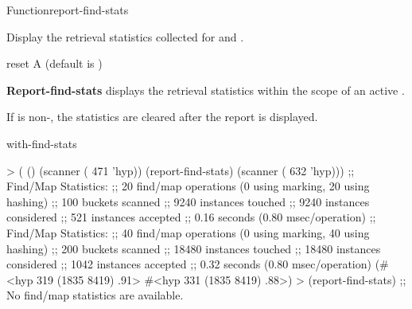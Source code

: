 \documentclass[10pt,twoside,english,pdftex]{article}
\begin{document}

\begin{functiondoc}{Function}{report-find-stats}{ }
%
%
%
  
\fnsyntax

\fnpurpose 
{}%
%
Display the retrieval statistics collected for
\textbf{} and
\textbf{}.

\fnpackage {}

\fnmodule {}

\fnargs
\begin{args}{reset}
\arg[reset] A  (default is \nil)
\end{args}

\fndescription 
{}%
\textbf{Report-find-stats} displays the retrieval statistics within
the scope of an active \textbf{}.

If  is non-\nil, the statistics are cleared after the
report is displayed.

\begin{alsos}{with-find-stats}
\end{alsos}

%
%
\fnexamples
\begin{example}
> ( ()
    (scanner ( 471 'hyp))
    (report-find-stats)
    (scanner ( 632 'hyp)))
;; Find/Map Statistics:
;;        20 find/map operations (0 using marking, 20 using hashing)
;;       100 buckets scanned
;;      9240 instances touched
;;      9240 instances considered
;;       521 instances accepted
;;      0.16 seconds (0.80 msec/operation)
;; Find/Map Statistics:
;;        40 find/map operations (0 using marking, 40 using hashing)
;;       200 buckets scanned
;;     18480 instances touched
;;     18480 instances considered
;;      1042 instances accepted
;;      0.32 seconds (0.80 msec/operation)
(#<hyp 319 (1835 8419) .91>
 #<hyp 331 (1835 8419) .88>)
> (report-find-stats)
;; No find/map statistics are available.
\end{example}

\end{functiondoc}
\end{document}
